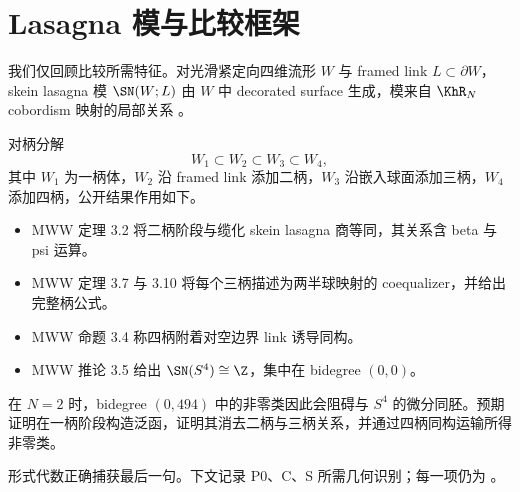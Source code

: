 \section{Lasagna 模与比较框架}

我们仅回顾比较所需特征。对光滑紧定向四维流形 $W$ 与 framed link $L\subset\partial W$，skein lasagna 模 $\SN(W;L)$ 由 $W$ 中 decorated surface 生成，模来自 $\KhR_N$ cobordism 映射的局部关系 \cite{MorrisonWalkerWedrich2019,ManolescuWalkerWedrich2023}。

对柄分解
\[
W_1\subset W_2\subset W_3\subset W_4,
\]
其中 $W_1$ 为一柄体，$W_2$ 沿 framed link 添加二柄，$W_3$ 沿嵌入球面添加三柄，$W_4$ 添加四柄，公开结果作用如下。
\begin{itemize}
\item MWW 定理 3.2 将二柄阶段与缆化 skein lasagna 商等同，其关系含 beta 与 psi 运算。
\item MWW 定理 3.7 与 3.10 将每个三柄描述为两半球映射的 coequalizer，并给出完整柄公式。
\item MWW 命题 3.4 称四柄附着对空边界 link 诱导同构。
\item MWW 推论 3.5 给出 $\SN(S^4)\cong\Z$，集中在 bidegree $(0,0)$。
\end{itemize}

在 $N=2$ 时，bidegree $(0,494)$ 中的非零类因此会阻碍与 $S^4$ 的微分同胚。预期证明在一柄阶段构造泛函，证明其消去二柄与三柄关系，并通过四柄同构运输所得非零类。

形式代数正确捕获最后一句。下文记录 P0、C、S 所需几何识别；每一项仍为 \Open。
